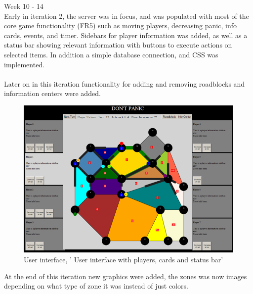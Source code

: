 Week 10 - 14\\
\newline
Early in iteration 2, the server was in focus, and was populated with most of the core game functionality (FR5) such as moving players, decreasing panic, info cards, events, and timer. Sidebars for player information was added, as well as a status bar showing relevant information with buttons to execute actions on selected items. In addition a simple database connection, and CSS was implemented.\\
\\
Later on in this iteration functionality for adding and removing roadblocks and information centers were added. 
\begin{figure}[H]
  \centering
    \includegraphics[width=1.0\textwidth]{img/earlyVersion.png}
  \caption{User interface, ' User interface with players, cards and status bar'} 
  \label{fig:earlyversion}
\end{figure}
At the end of this iteration new graphics were added, the zones was now images depending on what type of zone it was instead of just colors.

